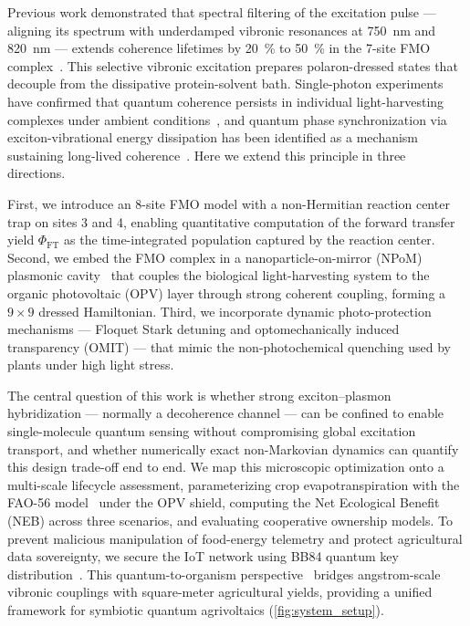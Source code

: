 \documentclass[12pt]{iopart}
\begin{document}
Previous work demonstrated that spectral filtering of the excitation pulse --- aligning its spectrum with underdamped vibronic resonances at \qty{750}{\nm} and \qty{820}{\nm} --- extends coherence lifetimes by \qty{20}{\percent} to \qty{50}{\percent} in the 7-site FMO complex~\cite{Kouam2026}.
This selective vibronic excitation prepares polaron-dressed states that decouple from the dissipative protein-solvent bath.
Single-photon experiments have confirmed that quantum coherence persists in individual light-harvesting complexes under ambient conditions~\cite{Li2023}, and quantum phase synchronization via exciton-vibrational energy dissipation has been identified as a mechanism sustaining long-lived coherence~\cite{Zhu2024}.
Here we extend this principle in three directions.

First, we introduce an 8-site FMO model with a non-Hermitian reaction center trap on sites 3 and 4, enabling quantitative computation of the forward transfer yield $\Phi_{\mathrm{FT}}$ as the time-integrated population captured by the reaction center.
Second, we embed the FMO complex in a nanoparticle-on-mirror (NPoM) plasmonic cavity~\cite{Chikkaraddy2016} that couples the biological light-harvesting system to the organic photovoltaic (OPV) layer through strong coherent coupling, forming a $9\times 9$ dressed Hamiltonian.
Third, we incorporate dynamic photo-protection mechanisms --- Floquet Stark detuning and optomechanically induced transparency (OMIT) --- that mimic the non-photochemical quenching used by plants under high light stress.

The central question of this work is whether strong exciton--plasmon hybridization --- normally a decoherence channel --- can be confined to enable single-molecule quantum sensing without compromising global excitation transport, and whether numerically exact non-Markovian dynamics can quantify this design trade-off end to end.
We map this microscopic optimization onto a multi-scale lifecycle assessment, parameterizing crop evapotranspiration with the FAO-56 model~\cite{Allen1998} under the OPV shield, computing the Net Ecological Benefit (NEB) across three scenarios, and evaluating cooperative ownership models. To prevent malicious manipulation of food-energy telemetry and protect agricultural data sovereignty, we secure the IoT network using BB84 quantum key distribution~\cite{Bennett1984}.
This quantum-to-organism perspective~\cite{Vandamme2025} bridges angstrom-scale vibronic couplings with square-meter agricultural yields, providing a unified framework for symbiotic quantum agrivoltaics (\cref{fig:system_setup}).
\end{document}
